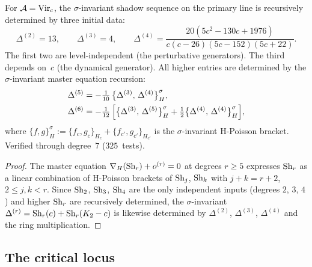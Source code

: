 \begin{theorem}
\label{thm:sigma-ring-finite-generation}
For $\mathcal{A} = \mathrm{Vir}_c$, the $\sigma$-invariant shadow sequence on the
primary line is recursively determined by three initial data:
\begin{equation}\label{eq:sigma-ring-generators}
\Delta^{(2)} = 13,
\qquad
\Delta^{(3)} = 4,
\qquad
\Delta^{(4)} = \frac{20(5c^2 - 130c + 1976)}
{c(c-26)(5c-152)(5c+22)}.
\end{equation}
The first two are level-independent
\textup{(}the perturbative generators\textup{)}.
The third depends on~$c$ \textup{(}the dynamical generator\textup{)}.
All higher entries are determined by the $\sigma$-invariant
master equation recursion:
\begin{align}
\Delta^{(5)} &= -\tfrac{1}{10}\,
 \bigl\{\Delta^{(3)},\, \Delta^{(4)}\bigr\}_H^\sigma,
\label{eq:sigma-ring-degree5} \\
\Delta^{(6)} &= -\tfrac{1}{12}\,
 \Bigl[\bigl\{\Delta^{(3)},\, \Delta^{(5)}\bigr\}_H^\sigma
 + \tfrac{1}{2}\bigl\{\Delta^{(4)},\, \Delta^{(4)}\bigr\}_H^\sigma
 \Bigr],
\label{eq:sigma-ring-degree6}
\end{align}
where $\{f, g\}_H^\sigma
:= \{f_c, g_c\}_{H_c} + \{f_{c'}, g_{c'}\}_{H_{c'}}$
is the $\sigma$-invariant H-Poisson bracket.
Verified through degree~$7$ \textup{(}$325$~tests\textup{)}.
\end{theorem}

\begin{proof}
The master equation
$\nabla_H(\mathrm{Sh}_r) + o^{(r)} = 0$
at degrees $r \geq 5$ expresses $\mathrm{Sh}_r$ as a linear combination
of H-Poisson brackets of $\mathrm{Sh}_j$, $\mathrm{Sh}_k$ with $j + k = r + 2$,
$2 \leq j,k < r$.
Since $\mathrm{Sh}_2$, $\mathrm{Sh}_3$, $\mathrm{Sh}_4$ are the only independent inputs
\textup{(}degrees $2$, $3$, $4$\textup{)} and higher $\mathrm{Sh}_r$ are
recursively determined, the $\sigma$-invariant
$\Delta^{(r)} = \mathrm{Sh}_r(c) + \mathrm{Sh}_r(K_2 - c)$ is likewise determined
by $\Delta^{(2)}$, $\Delta^{(3)}$, $\Delta^{(4)}$ and the ring
multiplication.
\end{proof}

%
%

\subsection{The critical locus}
\label{subsec:thqg-IV-critical-locus}

